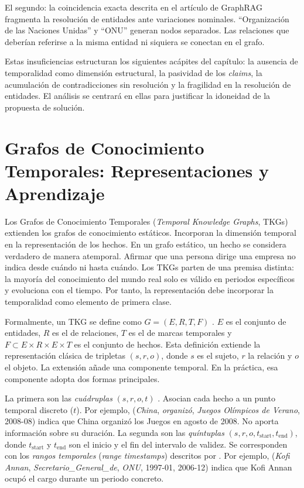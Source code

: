 El segundo: la coincidencia exacta descrita en el artículo de GraphRAG \cite{edge2024local} fragmenta la resolución de entidades ante variaciones nominales. ``Organización de las Naciones Unidas'' y ``ONU'' generan nodos separados. Las relaciones que deberían referirse a la misma entidad ni siquiera se conectan en el grafo.

Estas insuficiencias estructuran los siguientes acápites del capítulo: la ausencia de temporalidad como dimensión estructural, la pasividad de los \emph{claims}, la acumulación de contradicciones sin resolución y la fragilidad en la resolución de entidades. El análisis se centrará en ellas para justificar la idoneidad de la propuesta de solución.

\section{Grafos de Conocimiento Temporales: Representaciones y Aprendizaje}\label{sec:tkg-representations}

Los Grafos de Conocimiento Temporales (\emph{Temporal Knowledge Graphs}, TKGs) \cite{tkg_survey2024} extienden los grafos de conocimiento estáticos. Incorporan la dimensión temporal en la representación de los hechos. En un grafo estático, un hecho se considera verdadero de manera atemporal. Afirmar que una persona dirige una empresa no indica desde cuándo ni hasta cuándo. Los TKGs parten de una premisa distinta: la mayoría del conocimiento del mundo real solo es válido en periodos específicos y evoluciona con el tiempo. Por tanto, la representación debe incorporar la temporalidad como elemento de primera clase.

Formalmente, un TKG se define como $G = (E, R, T, F)$ \cite{tkg_survey2024}. $E$ es el conjunto de entidades, $R$ es el de relaciones, $T$ es el de marcas temporales y $F \subset E \times R \times E \times T$ es el conjunto de hechos. Esta definición extiende la representación clásica de tripletas $(s, r, o)$, donde $s$ es el sujeto, $r$ la relación y $o$ el objeto. La extensión añade una componente temporal. En la práctica, esa componente adopta dos formas principales.

La primera son las \emph{cuádruplas} $(s, r, o, t)$ \cite{tkg_survey2024}. Asocian cada hecho a un punto temporal discreto ($t$). Por ejemplo, (\textit{China}, \textit{organizó}, \textit{Juegos Olímpicos de Verano}, 2008-08) indica que China organizó los Juegos en agosto de 2008. No aporta información sobre su duración. La segunda son las \emph{quíntuplas} $(s, r, o, t_{\text{start}}, t_{\text{end}})$, donde $t_{\text{start}}$ y $t_{\text{end}}$ son el inicio y el fin del intervalo de validez. Se corresponden con los \emph{rangos temporales} (\emph{range timestamps}) descritos por \cite{tkgc_survey2023}. Por ejemplo, (\textit{Kofi Annan}, \textit{Secretario\_General\_de}, \textit{ONU}, 1997-01, 2006-12) indica que Kofi Annan ocupó el cargo durante un periodo concreto.

